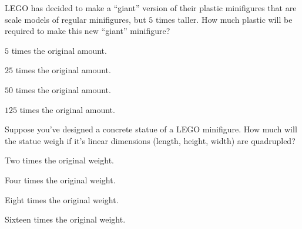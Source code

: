 \documentclass{ximera}
\author{Bart Snapp}
\begin{document}
\maketitle








\begin{exercise}
  LEGO has decided to make a ``giant'' version of their plastic
  minifigures that are scale models of regular minifigures, but $5$
  times taller.  How much plastic will be required to make this new
  ``giant'' minifigure?
    \begin{enumerate}\begin{multicols}{2}
    \item $5$ times the original amount.
    \item $25$ times the original amount.
    \item $50$ times the original amount.
    \item $125$ times the original amount.
    \end{multicols}
  \end{enumerate}
\end{exercise}







\begin{exercise}
  Suppose you've designed a concrete statue of a LEGO minifigure.  How
  much will the statue weigh if it's linear dimensions (length,
  height, width) are quadrupled?
  \begin{enumerate}\begin{multicols}{2}
    \item Two times the original weight.
    \item Four times the original weight.
    \item Eight times the original weight.
    \item Sixteen times the original weight. 
    \end{multicols}
  \end{enumerate}
\end{exercise}




\end{document}
